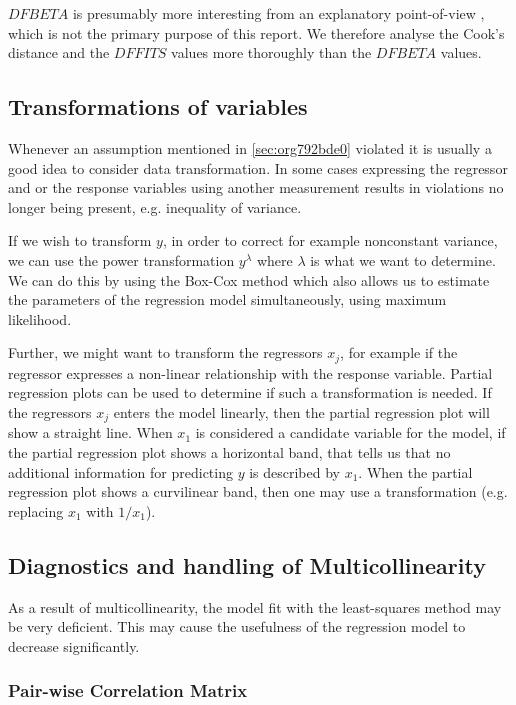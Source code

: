 \documentclass[11pt]{article}
\begin{document}
\(DFBETA\) is presumably more interesting from an explanatory point-of-view \cite{22286}, which is not the
primary purpose of this report. We therefore analyse the Cook's distance and the \(DFFITS\) values more
thoroughly than the \(DFBETA\) values.

\subsection{Transformations of variables}
\label{sec:orgb27b436}

Whenever an assumption mentioned in \ref{sec:org792bde0} violated it is usually a good idea to consider data 
transformation. In some cases expressing the regressor and or the response variables using another measurement
results in violations no longer being present, e.g. inequality of variance. 

If we wish to transform \(y\), in order to correct for example nonconstant variance, we can use the power
transformation \(y^\lambda\) where \(\lambda\) is what we want to determine. We can do this by using the Box-Cox method
which also allows us to estimate the parameters of the regression model simultaneously, using maximum likelihood.

Further, we might want to transform the regressors \(x_j\), for example if the regressor expresses a non-linear 
relationship with the response variable. Partial regression plots can be used to determine if such a transformation
is needed. If the regressors \(x_j\) enters the model linearly, then the partial regression plot will show a
straight line. When \(x_1\) is considered a candidate variable for the model, if the
partial regression plot shows a horizontal band, that tells us that no additional information for predicting \(y\) is 
described by \(x_1\). When the partial regression plot shows a curvilinear band, then one may use a transformation 
(e.g. replacing \(x_1\) with \(1/x_1\)).

\subsection{Diagnostics and handling of Multicollinearity}
\label{sec:org6b7a3d5}

As a result of multicollinearity, the model fit with the least-squares method may be very deficient.
This may cause the usefulness of the regression model to decrease significantly. 

\subsubsection{Pair-wise Correlation Matrix}
\label{sec:org8fc49f4}
\end{document}
